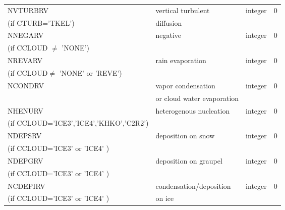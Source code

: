 \begin{center}
\begin{tabular} {|p{8cm}|p{4cm}|>{\centering}p{1.5cm}|p{1.5cm}<{\centering}|}
NVTURBRV & vertical turbulent& integer  &  0 \index{NVTURBRV!\innam{NAM\_BU\_RRV}}\\
(if CTURB='TKEL') &diffusion &   &  \\\hline
NNEGARV   & negative  & integer  &  0 \index{NREVARV!\innam{NAM\_BU\_RRV}}\\
(if CCLOUD $\neq$ 'NONE') & &   &  \\\hline
NREVARV   & rain evaporation & integer  &  0 \index{NREVARV!\innam{NAM\_BU\_RRV}}\\
(if CCLOUD$ \neq$ 'NONE' or 'REVE') & &   &  \\\hline
NCONDRV   & vapor condensation & integer  &  0 \index{NCONDRV!\innam{NAM\_BU\_RRV}}\\
          & or cloud water evaporation& &   \\\hline
NHENURV   & heterogenous nucleation & integer  &  0 \index{NHENURV!\innam{NAM\_BU\_RRV}}\\
(if CCLOUD='ICE3','ICE4','KHKO','C2R2') & &   &  \\\hline
NDEPSRV   & deposition on snow & integer  &  0 \index{NDEPSRV!\innam{NAM\_BU\_RRV}}\\
(if CCLOUD='ICE3' or 'ICE4' ) & &   &  \\\hline
NDEPGRV   & deposition on graupel & integer  &  0 \index{NDEPGRV!\innam{NAM\_BU\_RRV}}\\
(if CCLOUD='ICE3' or 'ICE4' ) & &   &  \\\hline
NCDEPIRV   & condensation/deposition & integer  &  0 \index{NCDEPIRV!\innam{NAM\_BU\_RRV}}\\
(if CCLOUD='ICE3' or 'ICE4' ) &on ice &   &  \\\hline
\end{tabular}
\end{center}
